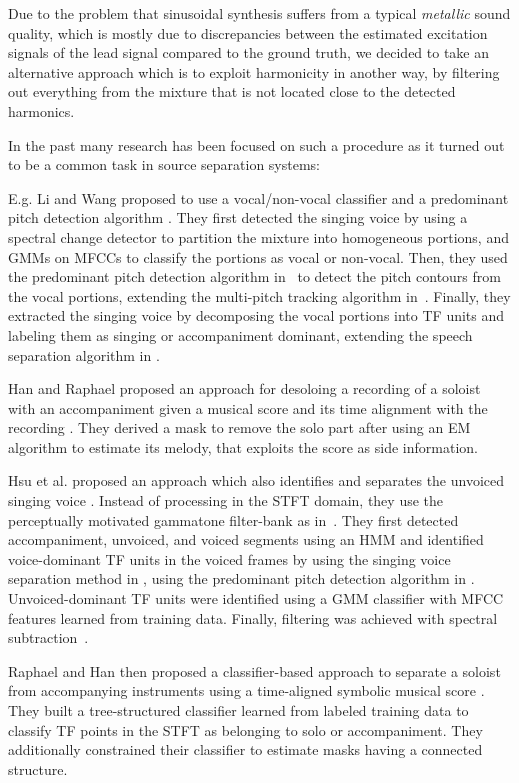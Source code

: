 Due to the problem that sinusoidal synthesis suffers from a typical \textit{metallic} sound quality, which is mostly due to discrepancies between the estimated excitation signals of the lead signal compared to the ground truth, we decided to take an alternative approach which is to exploit harmonicity in another way, by filtering out everything from the mixture that is not located close to the detected harmonics.
\par
In the past many research has been focused on such a procedure as it turned out to be a common task in source separation systems:

E.g. Li and Wang proposed to use a vocal/non-vocal classifier and a predominant pitch detection algorithm \cite{li06, li07}. They first detected the singing voice by using a spectral change detector \cite{duxbury03} to partition the mixture into homogeneous portions, and GMMs on MFCCs to classify the portions as vocal or non-vocal. Then, they used the predominant pitch detection algorithm in~\cite{li05} to detect the pitch contours from the vocal portions, extending the multi-pitch tracking algorithm in~\cite{wu03}. Finally, they extracted the singing voice by decomposing the vocal portions into TF units and labeling them as singing or accompaniment dominant, extending the speech separation algorithm in \cite{hu02}.

Han and Raphael proposed an approach for desoloing a recording of a soloist with an accompaniment given a musical score and its time alignment with the recording \cite{han07}. They derived a mask \cite{roweis01} to remove the solo part after using an EM algorithm to estimate its melody, that exploits the score as side information.

Hsu et al. proposed an approach which also identifies and separates the unvoiced singing voice \cite{hsu08,hsu10}. Instead of processing in the STFT domain, they use the perceptually motivated gammatone filter-bank as in~\cite{hu02,li07}. They first detected accompaniment, unvoiced, and voiced segments using an HMM and identified voice-dominant TF units in the voiced frames by using the singing voice separation method in \cite{li07}, using the predominant pitch detection algorithm in \cite{dressler062}. Unvoiced-dominant TF units were identified using a GMM classifier with MFCC features learned from training data. Finally, filtering was achieved with spectral subtraction~\cite{scalart96}.

Raphael and Han then proposed a classifier-based approach to separate a soloist from accompanying instruments using a time-aligned symbolic musical score \cite{raphael08}. They built a tree-structured classifier \cite{breiman84} learned from labeled training data to classify TF points in the STFT as belonging to solo or accompaniment. They additionally constrained their classifier to estimate masks having a connected structure.

